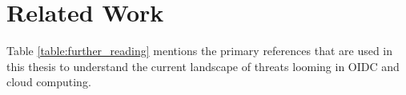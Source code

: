 \newpage
\section{Related Work}

Table \ref{table:further_reading} mentions the primary references that are used in this thesis to understand the current landscape of threats looming in OIDC and cloud computing.  



